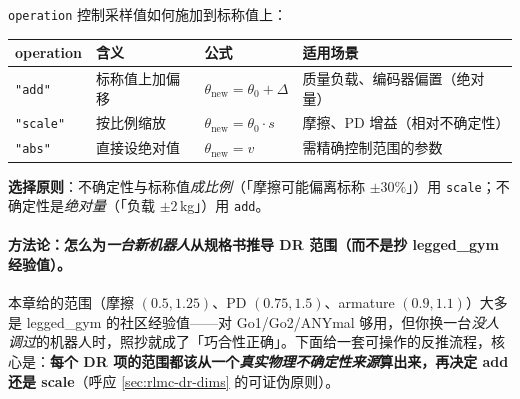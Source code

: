 \verb|operation| 控制采样值如何施加到标称值上：

\begin{center}
\small
\begin{tabular}{@{}llll@{}}
\toprule
operation & 含义 & 公式 & 适用场景 \\
\midrule
\verb|"add"| & 标称值上加偏移 & $\theta_{\mathrm{new}}=\theta_0+\Delta$ & 质量负载、编码器偏置（绝对量） \\
\verb|"scale"| & 按比例缩放 & $\theta_{\mathrm{new}}=\theta_0\cdot s$ & 摩擦、PD 增益（相对不确定性） \\
\verb|"abs"| & 直接设绝对值 & $\theta_{\mathrm{new}}=v$ & 需精确控制范围的参数 \\
\bottomrule
\end{tabular}
\end{center}

\textbf{选择原则}：不确定性与标称值\emph{成比例}（「摩擦可能偏离标称 $\pm 30\%$」）用 \verb|scale|；不确定性是\emph{绝对量}（「负载 $\pm 2$\,kg」）用 \verb|add|。

\paragraph{方法论：怎么为\emph{一台新机器人}从规格书推导 DR 范围（而不是抄 legged\_gym 经验值）。}本章给的范围（摩擦 $(0.5,1.25)$、PD $(0.75,1.5)$、armature $(0.9,1.1)$）大多是 legged\_gym 的社区经验值——对 Go1/Go2/ANYmal 够用，但你换一台\emph{没人调过}的机器人时，照抄就成了「巧合性正确」。下面给一套可操作的反推流程，核心是：\textbf{每个 DR 项的范围都该从一个\emph{真实物理不确定性来源}算出来，再决定 add 还是 scale}（呼应 \cref{sec:rlmc-dr-dims} 的可证伪原则）。

